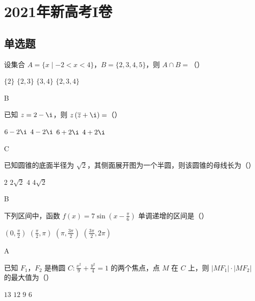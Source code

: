 \chapter{2021年新高考I卷}

\section{单选题}

\begin{problem}
设集合 \(A=\{x\mid -2<x<4\}\)，\(B=\{2,3,4,5\}\)，则 \(A\cap B=\)（\quad）

\choices
    {\(\{2\}\)}
    {\(\{2,3\}\)}
    {\(\{3,4\}\)}
    {\(\{2,3,4\}\)}
\end{problem}

\begin{answer}
B
\end{answer}

\begin{problem}
已知 \(z=2-\i\)，则 \(z\left( \overline{z}+\i \right)=\)（\quad）

\choices
    {\(6-2\i\)}
    {\(4-2\i\)}
    {\(6+2\i\)}
    {\(4+2\i\)}
\end{problem}

\begin{answer}
C
\end{answer}

\begin{problem}
已知圆锥的底面半径为 \(\sqrt{2}\)，其侧面展开图为一个半圆，则该圆锥的母线长为（\quad）

\choices
    {\(2\)}
    {\(2\sqrt{2}\)}
    {\(4\)}
    {\(4\sqrt{2}\)}
\end{problem}

\begin{answer}
B
\end{answer}

\begin{problem}
下列区间中，函数 \(f(x)=7\sin\left( x-\frac{\pi}{6}\right)\) 单调递增的区间是（\quad）

\choices
    {\(\left( 0,\frac{\pi}{2}\right)\)}
    {\(\left( \frac{\pi}{2},\pi\right)\)}
    {\(\left( \pi,\frac{3\pi}{2}\right)\)}
    {\(\left( \frac{3\pi}{2},2\pi\right)\)}
\end{problem}

\begin{answer}
A
\end{answer}

\begin{problem}
已知 \(F_1\)，\(F_2\) 是椭圆 \(C:\frac{x^2}{9}+\frac{y^2}{4}=1\) 的两个焦点，点 \(M\) 在 \(C\) 上，则 \(|MF_1|\cdot|MF_2|\) 的最大值为（\quad）

\choices
    {\(13\)}
    {\(12\)}
    {\(9\)}
    {\(6\)}
\end{problem}

